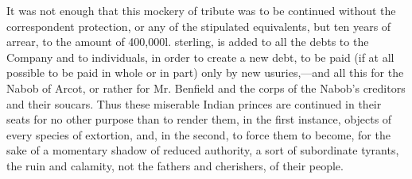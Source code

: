 It was not enough that this mockery of tribute was to be continued without the correspondent protection, or any of the stipulated equivalents, but ten years of arrear, to the amount of 400,000l. sterling, is added to all the debts to the Company and to individuals, in order to create a new debt, to be paid (if at all possible to be paid in whole or in part) only by new usuries,—and all this for the Nabob of Arcot, or rather for Mr. Benfield and the corps of the Nabob's creditors and their soucars. Thus these miserable Indian princes are continued in their seats for no other purpose than to render them, in the first instance, objects of every species of extortion, and, in the second, to force them to become, for the sake of a momentary shadow of reduced authority, a sort of subordinate tyrants, the ruin and calamity, not the fathers and cherishers, of their people.

